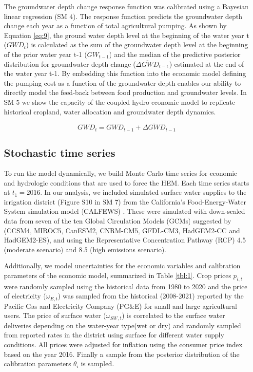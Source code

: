 \documentclass[a4paper,fleqn]{cas-sc}
\begin{document}
The groundwater depth change response function was calibrated using a Bayesian linear regression (SM 4). The response function predicts the groundwater depth change each year as a function of total agricultural pumping. As shown by Equation \ref{eq:9}, the ground water depth level at the beginning of the water year t ($GWD_{t}$) is calculated as the sum of the groundwater depth level at the beginning of the prior water year t-1 ($GW_{t-1}$)  and the median of the predictive posterior distribution for groundwater depth change ($\overline{\Delta GWD}_{t-1}$) estimated at the end of the water year t-1. By embedding this function into the economic model defining the pumping cost as a function of the groundwater depth enables our ability to directly model the feed-back between food production and groundwater levels. In SM 5 we show the capacity of the coupled hydro-economic model to replicate historical cropland, water allocation and groundwater depth dynamics.

\begin{equation}
\label{eq:9}
GWD_{t} = GWD_{t-1} + \overline{\Delta GWD}_{t-1}
\end{equation}

\subsection{Stochastic time series}\label{sct:2.2}

To run the model dynamically, we build Monte Carlo time series for economic and hydrologic conditions that are used to force the HEM. Each time series starts at $t_{1}=2016$. In our analysis, we included simulated surface water supplies to the irrigation district (Figure S10 in SM 7) from the California’s Food-Energy-Water System simulation model (CALFEWS) \citep{zeff_californias_2021}. These were simulated with down-scaled data from seven of the ten Global Circulation Models (GCMs) suggested by \citet{pierce_climate_2018} (CCSM4, MIROC5, CanESM2, CNRM-CM5, GFDL-CM3, HadGEM2-CC and HadGEM2-ES), and using the Representative Concentration Pathway (RCP) 4.5 (moderate scenario) and 8.5 (high emissions scenario). 

Additionally, we model uncertainties for the economic variables and calibration parameters of the economic model, summarized in Table \ref{tbl:1}. Crop prices $p_{i,t}$ were randomly sampled using the historical data from 1980 to 2020 \citep{usda_national_2020} and the price of electricity ($\omega_{E,t}$) was sampled from the historical (2008-2021) reported by the Pacific Gas and Electricity Company (PG\&E) for small and large agricultural users. The price of surface water ($\omega_{SW,t}$) is correlated to the surface water deliveries depending on the water-year type(wet or dry) and randomly sampled from reported rates in the district using surface for different water supply conditions. All prices were adjusted for inflation using the consumer price index based on the year 2016. Finally a sample from the posterior distribution of the calibration parameters $\theta_{i}$ is sampled.
\end{document}
